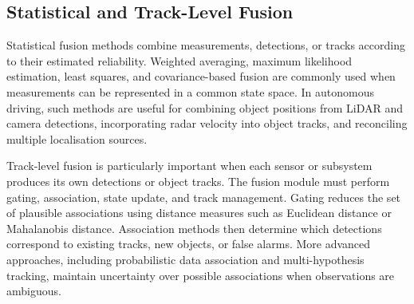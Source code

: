\documentclass{ieeeaccess}
\begin{document}
\subsection{Statistical and Track-Level Fusion}
\label{subsec:track-fusion}

Statistical fusion methods combine measurements, detections, or tracks according to their estimated reliability. Weighted averaging, maximum likelihood estimation, least squares, and covariance-based fusion are commonly used when measurements can be represented in a common state space. In autonomous driving, such methods are useful for combining object positions from LiDAR and camera detections, incorporating radar velocity into object tracks, and reconciling multiple localisation sources.

Track-level fusion is particularly important when each sensor or subsystem produces its own detections or object tracks. The fusion module must perform gating, association, state update, and track management. Gating reduces the set of plausible associations using distance measures such as Euclidean distance or Mahalanobis distance. Association methods then determine which detections correspond to existing tracks, new objects, or false alarms. More advanced approaches, including probabilistic data association and multi-hypothesis tracking, maintain uncertainty over possible associations when observations are ambiguous.
\end{document}

